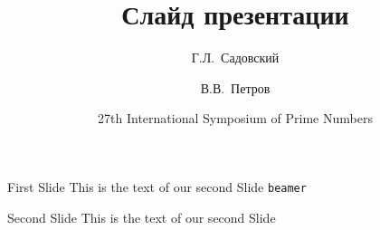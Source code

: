\documentclass[aspectratio=169]{beamer} %
\begin{document}
\title{Слайд презентации}
\subtitle{}
\author[Садовский, Петров]
{Г.Л.~Садовский \and В.В.~Петров}

\date[ISPN ’80]{27th International Symposium of Prime Numbers}


    
\begin{frame}{}
\titlepage
\end{frame}

\begin{frame}[c]{First Slide}
    This is the text of our second Slide \texttt{beamer}
\end{frame}

\begin{frame}{Second Slide}
    This is the text of our second Slide
\end{frame}
\end{document}

